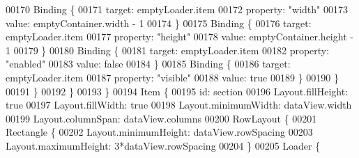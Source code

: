 \begin{DoxyCode}
{00170 \textcolor{comment}{                                Binding \{}
00171 \textcolor{comment}{                                    target: emptyLoader.item}
00172 \textcolor{comment}{                                    property: "width"}
00173 \textcolor{comment}{                                    value: emptyContainer.width - 1}
00174 \textcolor{comment}{                                \}}
00175 \textcolor{comment}{                                Binding \{}
00176 \textcolor{comment}{                                    target: emptyLoader.item}
00177 \textcolor{comment}{                                    property: "height"}
00178 \textcolor{comment}{                                    value: emptyContainer.height - 1}
00179 \textcolor{comment}{                                \}}
00180 \textcolor{comment}{                                Binding \{}
00181 \textcolor{comment}{                                    target: emptyLoader.item}
00182 \textcolor{comment}{                                    property: "enabled"}
00183 \textcolor{comment}{                                    value: false}
00184 \textcolor{comment}{                                \}}
00185 \textcolor{comment}{                                Binding \{}
00186 \textcolor{comment}{                                    target: emptyLoader.item}
00187 \textcolor{comment}{                                    property: "visible"}
00188 \textcolor{comment}{                                    value: true}
00189 \textcolor{comment}{                                \}}
00190 \textcolor{comment}{                            \}}
00191 \textcolor{comment}{                        \}}
00192 \textcolor{comment}{                    \}}
00193 \textcolor{comment}{                \}}
00194 \textcolor{comment}{                Item \{}
00195 \textcolor{comment}{                    id: section}
00196 \textcolor{comment}{                    Layout.fillHeight: true}
00197 \textcolor{comment}{                    Layout.fillWidth: true}
00198 \textcolor{comment}{                    Layout.minimumWidth: dataView.width}
00199 \textcolor{comment}{                    Layout.columnSpan: dataView.columns}
00200 \textcolor{comment}{                    RowLayout \{}
00201 \textcolor{comment}{                        Rectangle \{}
00202 \textcolor{comment}{                            Layout.minimumHeight: dataView.rowSpacing}
00203 \textcolor{comment}{                            Layout.maximumHeight: 3*dataView.rowSpacing}
00204 \textcolor{comment}{                        \}}
00205 \textcolor{comment}{                        Loader \{}
}
\end{DoxyCode}
